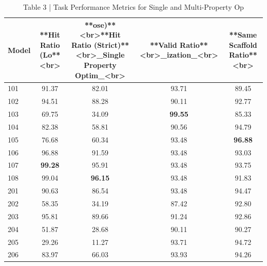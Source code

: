 \begin{table}[t]
\centering
\caption{Table 3 | Task Performance Metrics for Single and Multi-Property Op}
\label{tab:2503.03503}
\begin{tabular}{lcccc}
\toprule
Model & **Hit Ratio (Lo**<br> & **ose)**<br>**Hit Ratio (Strict)**<br>\_Single Property Optim\_<br> & **Valid Ratio**<br>\_ization\_<br> & **Same Scaffold Ratio**<br> \\
\midrule
101 & 91.37 & 82.01 & 93.71 & 89.45 \\
102 & 94.51 & 88.28 & 90.11 & 92.77 \\
103 & 69.75 & 34.09 & \textbf{99.55} & 85.33 \\
104 & 82.38 & 58.81 & 90.56 & 94.79 \\
105 & 76.68 & 60.34 & 93.48 & \textbf{96.88} \\
106 & 96.88 & 91.59 & 93.48 & 93.03 \\
107 & \textbf{99.28} & 95.91 & 93.48 & 93.75 \\
108 & 99.04 & \textbf{96.15} & 93.48 & 91.83 \\
201 & 90.63 & 86.54 & 93.48 & 94.47 \\
202 & 58.35 & 34.19 & 87.42 & 92.80 \\
203 & 95.81 & 89.66 & 91.24 & 92.86 \\
204 & 51.87 & 28.68 & 90.11 & 90.27 \\
205 & 29.26 & 11.27 & 93.71 & 94.72 \\
206 & 83.97 & 66.03 & 93.93 & 94.26 \\
\bottomrule
\end{tabular}
\end{table}
